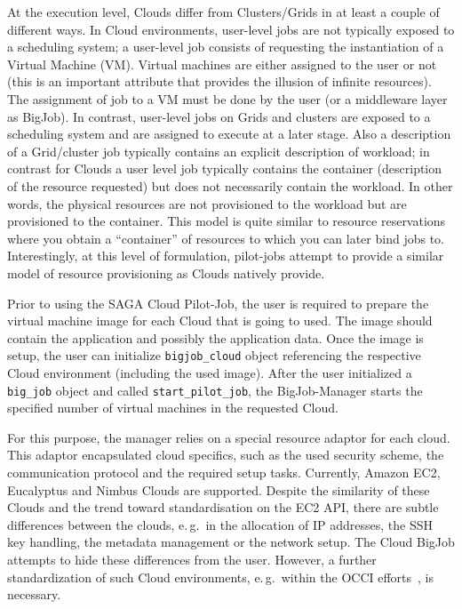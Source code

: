 \documentclass[conference,final]{IEEEtran}
\begin{document}
At the execution level, Clouds differ from Clusters/Grids in at least
a couple of different ways. In Cloud environments, user-level jobs are
not typically exposed to a scheduling system; a user-level job
consists of requesting the instantiation of a Virtual Machine (VM).
Virtual machines are either assigned to the user or not (this is an
important attribute that provides the illusion of infinite resources).
The assignment of job to a VM must be done by the user (or a
middleware layer as BigJob).  In contrast, user-level jobs on Grids
and clusters are exposed to a scheduling system and are assigned to
execute at a later stage.  Also a description of a Grid/cluster job
typically contains an explicit description of workload; in contrast
for Clouds a user level job typically contains the container
(description of the resource requested) but does not necessarily
contain the workload. In other words, the physical resources are not
provisioned to the workload but are provisioned to the container.
This model is quite similar to resource reservations where you obtain
a ``container'' of resources to which you can later bind jobs
to. Interestingly, at this level of formulation, pilot-jobs attempt to
provide a similar model of resource provisioning as Clouds natively
provide.

Prior to using the SAGA Cloud Pilot-Job, the user is required to
prepare the virtual machine image for each Cloud that is going to
used. The image should contain the application and possibly the
application data. Once the image is setup, the user can initialize
\texttt{bigjob\_cloud} object referencing the respective Cloud
environment (including the used image). After the user initialized 
a \texttt{big\_job} object and called \texttt{start\_pilot\_job},
the BigJob-Manager starts the specified number of virtual machines 
in the requested Cloud. 

For this purpose, the manager relies on a special resource adaptor
for each cloud. This adaptor encapsulated cloud specifics, such as the used
security scheme, the communication protocol and the required setup tasks. Currently,
Amazon EC2, Eucalyptus and Nimbus Clouds are supported. Despite the similarity 
of these Clouds and the trend toward standardisation on the
EC2 API, there are subtle differences between the clouds, e.\,g.\ in the allocation
of IP addresses, the SSH key handling, the metadata management or 
the network setup. The Cloud BigJob attempts to hide these differences 
from the user. However, a further standardization of such Cloud environments, 
e.\,g.\ within the OCCI efforts~\cite{occi}, is necessary.
\end{document}

